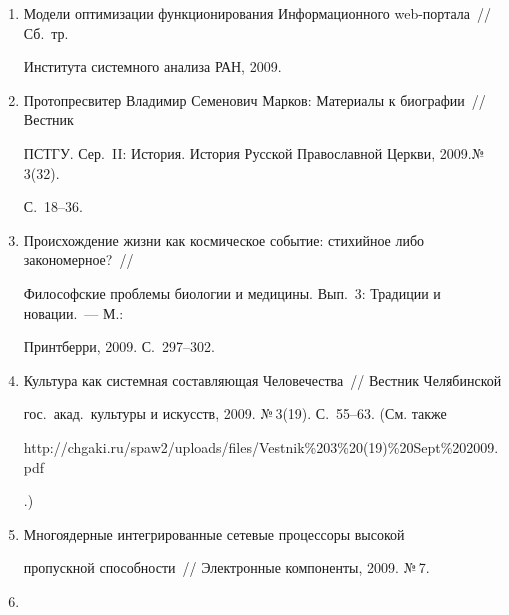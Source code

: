 \begin{enumerate}[1.]
С.~4--10.





\item {}


Модели оптимизации функционирования Информационного web-портала~// Сб.\ тр.\ 


Института системного анализа РАН, 2009.





\item {}


Протопресвитер Владимир Семенович Марков: Материалы к биографии~// Вестник 


ПСТГУ. Сер.~II: История. История Русской Православной Церкви, 2009.\linebreak №\,3(32). 


С.~18--36.





\item {}


Происхождение жизни как космическое событие: стихийное либо закономерное?~// 


Философские проб\-ле\-мы биологии и медицины. Вып.~3: Традиции и новации.~--- М.: 


Принтберри, 2009. С.~297--302.





\item {}


Культура как системная составляющая Человечества~// Вестник Челябинской 


гос.\ акад.\ культуры и искусств, 2009. №\,3(19). С.~55--63. (См. также {\sf 


http://\linebreak chgaki.ru/spaw2/uploads/files/Vestnik\%203\%20(19)\%20Sept\%\linebreak 202009.pdf}.) 





\item {} Многоядерные интегрированные сетевые процессоры высокой 


пропускной способности~// Электронные компоненты, 2009. №\,7.





\item {}



\end{enumerate}
